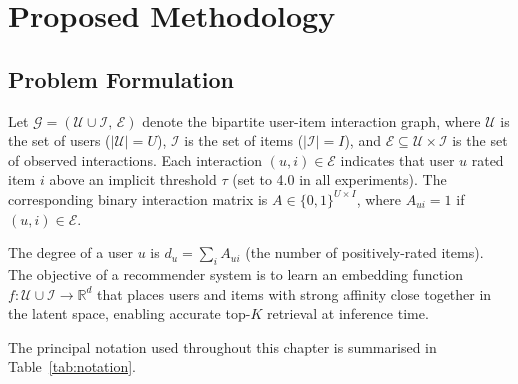 \chapter{Proposed Methodology}
\label{chap:methodology}
\graphicspath{{../figures/}{Chapter3/}}

\section{Problem Formulation}

Let $\mathcal{G} = (\mathcal{U} \cup \mathcal{I},\, \mathcal{E})$ denote the bipartite user-item interaction graph, where $\mathcal{U}$ is the set of users ($|\mathcal{U}| = U$), $\mathcal{I}$ is the set of items ($|\mathcal{I}| = I$), and $\mathcal{E} \subseteq \mathcal{U} \times \mathcal{I}$ is the set of observed interactions. Each interaction $(u, i) \in \mathcal{E}$ indicates that user $u$ rated item $i$ above an implicit threshold $\tau$ (set to 4.0 in all experiments). The corresponding binary interaction matrix is $A \in \{0,1\}^{U \times I}$, where $A_{ui} = 1$ if $(u, i) \in \mathcal{E}$.

The degree of a user $u$ is $d_u = \sum_{i} A_{ui}$ (the number of positively-rated items). The objective of a recommender system is to learn an embedding function $f: \mathcal{U} \cup \mathcal{I} \to \mathbb{R}^d$ that places users and items with strong affinity close together in the latent space, enabling accurate top-$K$ retrieval at inference time.

The principal notation used throughout this chapter is summarised in Table~\ref{tab:notation}.

